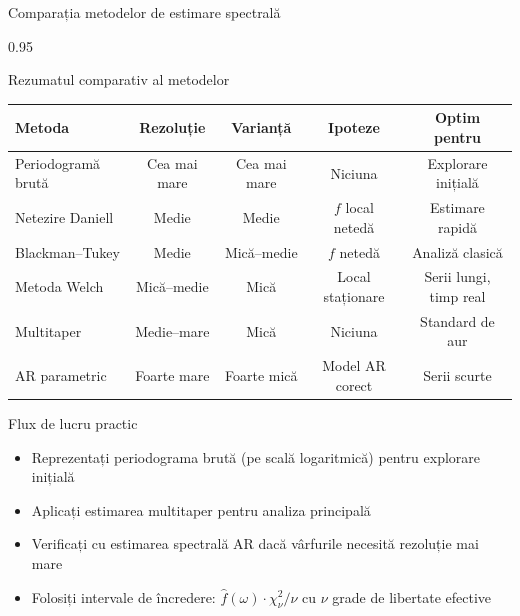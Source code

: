 \documentclass[9pt, aspectratio=169, t]{beamer}
\begin{document}
\begin{frame}{Comparația metodelor de estimare spectrală}
    \begin{cminipage}{0.95\textwidth}
    \vspace{-3mm}
    {\scriptsize
    \begin{block}{Rezumatul comparativ al metodelor}
    \vspace{-2mm}
    \begin{center}
    \begin{tabular}{l|c|c|c|c}
        \toprule
        \textbf{Metoda} & \textbf{Rezoluție} & \textbf{Varianță} & \textbf{Ipoteze} & \textbf{Optim pentru} \\
        \midrule
        Periodogramă brută & Cea mai mare & Cea mai mare & Niciuna & Explorare inițială \\
        Netezire Daniell & Medie & Medie & $f$ local netedă & Estimare rapidă \\
        Blackman--Tukey & Medie & Mică--medie & $f$ netedă & Analiză clasică \\
        Metoda Welch & Mică--medie & Mică & Local staționare & Serii lungi, timp real \\
        Multitaper & Medie--mare & Mică & Niciuna & Standard de aur \\
        AR parametric & Foarte mare & Foarte mică & Model AR corect & Serii scurte \\
        \bottomrule
    \end{tabular}
    \end{center}
    \end{block}
    }
    \vspace{-2mm}
    \begin{exampleblock}{Flux de lucru practic}
        \begin{itemize}\setlength{\itemsep}{0pt}
            \item[\textcolor{MainBlue}{\textbf{1.}}] Reprezentați periodograma brută (pe scală logaritmică) pentru explorare inițială
            \item[\textcolor{MainBlue}{\textbf{2.}}] Aplicați estimarea multitaper pentru analiza principală
            \item[\textcolor{MainBlue}{\textbf{3.}}] Verificați cu estimarea spectrală AR dacă vârfurile necesită rezoluție mai mare
            \item[\textcolor{MainBlue}{\textbf{4.}}] Folosiți intervale de încredere: $\hat{f}(\omega) \cdot \chi^2_\nu / \nu$ cu $\nu$ grade de libertate efective
        \end{itemize}
    \end{exampleblock}
    \end{cminipage}
\end{frame}
\end{document}
